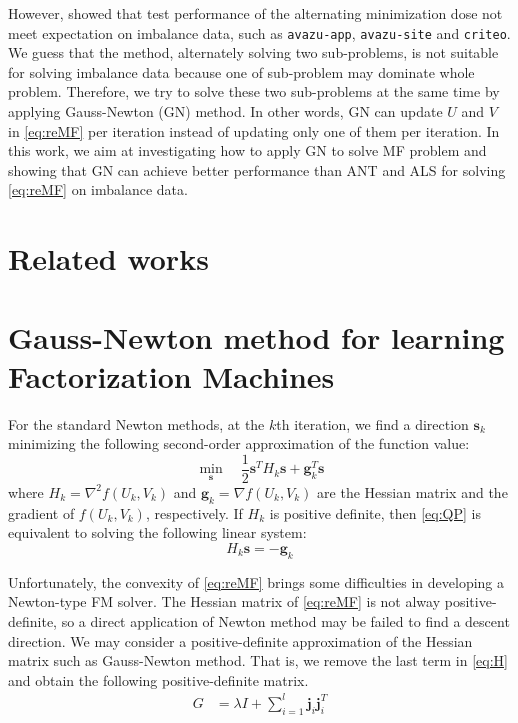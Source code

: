 \documentclass[11pt,twoside]{article}
\newcommand{\bsym}[1]{\ensuremath{\boldsymbol{#1}}}
\newcommand{\bj}{\ensuremath{\bsym{j}}}
\newcommand{\bs}{\ensuremath{\bsym{s}}}
\newcommand{\bg}{\ensuremath{\bsym{g}}}
\begin{document}
However, \citet{test17a} showed that test performance of the alternating minimization dose not meet expectation on imbalance data, such as {\tt avazu-app}, {\tt avazu-site} and {\tt criteo}. We guess that the method, alternately solving two sub-problems, is not suitable for solving imbalance data because one of sub-problem may dominate whole problem. Therefore, we try to solve these two sub-problems at the same time by applying Gauss-Newton (GN) method. In other words, GN can update $U$ and $V$ in \eqref{eq:reMF} per iteration instead of updating only one of them per iteration. In this work, 
we aim at investigating how to apply GN to solve MF problem and showing that GN can achieve better performance than ANT and ALS for solving \eqref{eq:reMF} on imbalance data.

\section{Related works}
\section{Gauss-Newton method for learning Factorization Machines}
For the standard Newton methods, at the $k$th iteration, we find a direction $\bs_k$ minimizing the following second-order approximation of the function value:
\begin{equation}
    \min_{\bs} \quad \frac{1}{2}\bs^T H_k \bs + \bg_k^T \bs
\label{eq:QP}
\end{equation}
where $H_k = \nabla^2 f(U_k, V_k)$ and $\bg_k = \nabla f(U_k, V_k)$ are the Hessian matrix and the gradient of $f(U_k, V_k)$, respectively.
If $H_k$ is positive definite, then \eqref{eq:QP} is equivalent to solving the following linear system:
\begin{equation}
    H_k\bs = -\bg_k
\label{eq:HLE}
\end{equation}

Unfortunately, the convexity of \eqref{eq:reMF} brings some difficulties in developing a Newton-type FM solver.
The Hessian matrix of \eqref{eq:reMF}  is not alway positive-definite, so a direct application of Newton method may be failed to find a descent direction.
We may consider a positive-definite approximation of the Hessian matrix such as Gauss-Newton method. 
That is, we remove the last term in \eqref{eq:H} and obtain the following positive-definite matrix.
\begin{equation}
    \begin{aligned}
    G &= \lambda I + \sum_{i=1}^{l}\bj_i\bj_i^T
    \label{eq:G}
    \end{aligned}
\end{equation}
\end{document}
